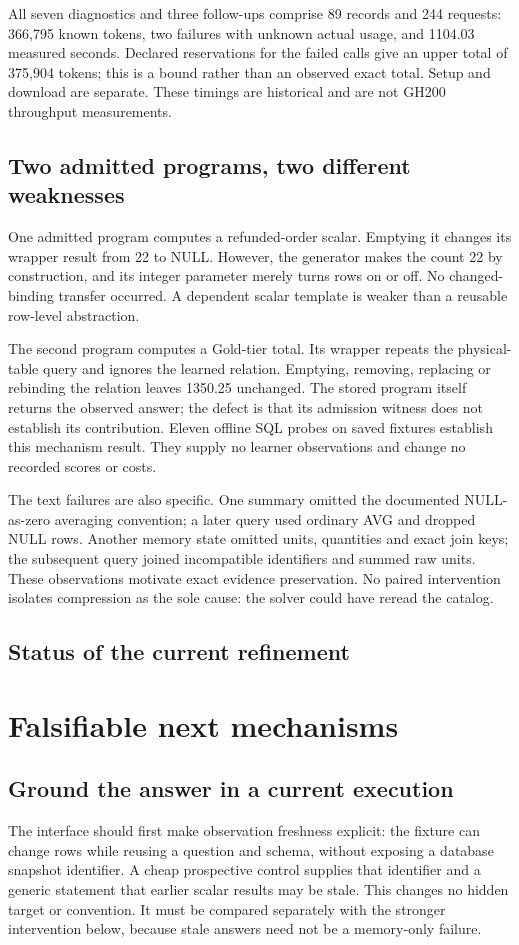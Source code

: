 \documentclass[10pt,twocolumn]{article}
\begin{document}
All seven diagnostics and three follow-ups comprise 89 records and 244
requests: 366,795 known tokens, two failures with unknown actual usage, and
1104.03 measured seconds. Declared reservations for the failed calls give an
upper total of 375,904 tokens; this is a bound rather than an observed exact
total. Setup and download are separate. These timings are historical and are
not GH200 throughput measurements.

\subsection{Two admitted programs, two different weaknesses}
One admitted program computes a refunded-order scalar. Emptying it changes its
wrapper result from 22 to NULL. However, the generator makes the count 22 by
construction, and its integer parameter merely turns rows on or off. No
changed-binding transfer occurred. A dependent scalar template is weaker than
a reusable row-level abstraction.

The second program computes a Gold-tier total. Its wrapper repeats the
physical-table query and ignores the learned relation. Emptying, removing,
replacing or rebinding the relation leaves 1350.25 unchanged. The stored program
itself returns the observed answer; the defect is that its admission witness
does not establish its contribution. Eleven offline SQL probes on saved
fixtures establish this mechanism result. They supply no learner observations
and change no recorded scores or costs.

The text failures are also specific. One summary omitted the documented
NULL-as-zero averaging convention; a later query used ordinary AVG and dropped
NULL rows. Another memory state omitted units, quantities and exact join keys;
the subsequent query joined incompatible identifiers and summed raw units.
These observations motivate exact evidence preservation. No paired intervention
isolates compression as the sole cause: the solver could have reread the catalog.

\subsection{Status of the current refinement}\label{sec:current}


\section{Falsifiable next mechanisms}
\subsection{Ground the answer in a current execution}
The interface should first make observation freshness explicit: the fixture
can change rows while reusing a question and schema, without exposing a database
snapshot identifier. A cheap prospective control supplies that identifier and
a generic statement that earlier scalar results may be stale. This changes no
hidden target or convention. It must be compared separately with the stronger
intervention below, because stale answers need not be a memory-only failure.
\end{document}
